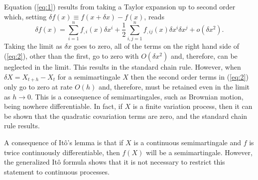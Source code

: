 \documentclass[12pt]{article}
\begin{document}
Equation (\ref{eq:1}) results from taking a Taylor expansion up to second order which, setting $\delta f(x)\equiv f(x+\delta x)-f(x)$, reads
\begin{equation}\label{eq:2}
\delta f(x)= \sum_{i=1}^n f_{,i}(x)\delta x^i + \frac{1}{2}\sum_{i,j=1}^n f_{,ij}(x)\delta x^i\delta x^j + o(\delta x^2).
\end{equation}
Taking the limit as $\delta x$ goes to zero, all of the terms on the right hand side of (\ref{eq:2}), other than the first, go to zero with  $O(\delta x^2)$ and, therefore, can be neglected in the limit. This results in the standard chain rule. However, when $\delta X = X_{t+h}-X_t$ for a semimartingale $X$ then the second order terms in (\ref{eq:2}) only go to zero at rate $O(h)$ and, therefore, must be retained even in the limit as $h\rightarrow 0$. This is a consequence of semimartingales, such as Brownian motion, being nowhere differentiable.
In fact, if $X$ is a finite variation process, then it can be shown that the quadratic covariation terms are zero, and the standard chain rule results.

A consequence of It\^o's lemma is that if $X$ is a continuous semimartingale and $f$ is twice continuously differentiable, then $f(X)$ will be a semimartingale. However, the generalized It\^o formula shows that it is not necessary to restrict this statement to continuous processes.
\end{document}
